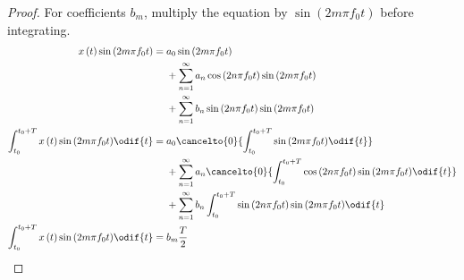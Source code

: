 \documentclass{article}
\begin{document}
\begin{proof}
    For coefficients \(b_m\), multiply the equation by \(\sin{\left( 2 m \pi f_0 t \right)}\) before integrating.
    \begin{align*}
        x\left( t \right) \sin{\left( 2 m \pi f_0 t \right)}                               & = \begin{aligned}[t]
                                                                                                    & a_0 \sin{\left( 2 m \pi f_0 t \right)}                                                          \\
                                                                                                    & + \sum_{n = 1}^\infty a_n \cos{\left( 2 n \pi f_0 t \right)} \sin{\left( 2 m \pi f_0 t \right)} \\
                                                                                                    & + \sum_{n = 1}^\infty b_n \sin{\left( 2 n \pi f_0 t \right)} \sin{\left( 2 m \pi f_0 t \right)}
                                                                                               \end{aligned}                                                    \\
        \int_{t_0}^{t_0 + T} x\left( t \right) \sin{\left( 2 m \pi f_0 t \right)} \odif{t} & = \begin{aligned}[t]
                                                                                                    & a_0 \cancelto{0}{\int_{t_0}^{t_0 + T} \sin{\left( 2 m \pi f_0 t \right)} \odif{t}}                                                          \\
                                                                                                    & + \sum_{n = 1}^\infty a_n \cancelto{0}{\int_{t_0}^{t_0 + T} \cos{\left( 2 n \pi f_0 t \right)} \sin{\left( 2 m \pi f_0 t \right)} \odif{t}} \\
                                                                                                    & + \sum_{n = 1}^\infty b_n \int_{t_0}^{t_0 + T} \sin{\left( 2 n \pi f_0 t \right)} \sin{\left( 2 m \pi f_0 t \right)} \odif{t}
                                                                                               \end{aligned} \\
        \int_{t_0}^{t_0 + T} x\left( t \right) \sin{\left( 2 m \pi f_0 t \right)} \odif{t} & = b_m \frac{T}{2}                                                                                                                                       \\

\end{align*}
\end{proof}
\end{document}

